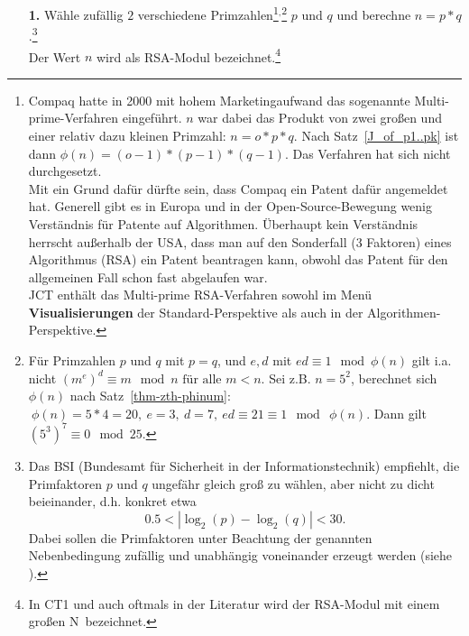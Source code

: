 \begin{refsegment}
\begin{itemize}
\item[\textbf{1.}] Wähle zufällig $2$ verschiedene Primzahlen\footnote{%
Compaq hatte in 2000 mit hohem Marketingaufwand das sogenannte
Multi-prime-Verfahren eingeführt.
$n$ war dabei das Produkt von zwei großen und einer relativ dazu kleinen Primzahl:
$n=o*p*q.$ Nach Satz~\ref{J_of_p1..pk} ist dann $ \phi(n)= (o-1)*(p-1)*(q-1).$ Das
Verfahren hat sich nicht durchgesetzt.\\
Mit ein Grund dafür dürfte sein, dass Compaq ein Patent
dafür angemeldet hat. Generell gibt es in Europa und in der Open-Source-Bewegung
 wenig Verständnis für Patente auf Algorithmen.
Überhaupt kein Verständnis herrscht außerhalb der USA, dass man auf den
Sonderfall (3 Faktoren) eines Algorithmus (RSA) ein Patent beantragen kann,
obwohl das Patent für den allgemeinen Fall schon fast abgelaufen war.\\
   JCT enthält das Multi-prime RSA-Verfahren sowohl im
   Menü \textbf{Visualisierungen} der Standard-Perspektive als auch in der
   Algorithmen-Perspektive.%
}$^,$\footnote{%
Für Primzahlen $p$ und $q$ mit $p=q$, und $e,d$ mit $ed\equiv 1 \mod \phi(n)$
gilt i.a. nicht $ (m^{e})^d \equiv m \mod n \text{ für alle } m <n.$
Sei z.B. $n=5^2$, berechnet sich $\phi(n)$ nach Satz~\ref{thm-zth-phinum}:
$~\phi(n)=5*4=20,~e=3,~d=7,~ed\equiv 21\equiv 1\mod~\phi(n).$ Dann gilt $ (5^3)^7 \equiv 0 \mod 25.$
} $p$ und $q$ und berechne $n = p*q$.\footnote{%
Das BSI  (Bundesamt für Sicherheit in der Informationstechnik) empfiehlt, die Primfaktoren $p$
und $q$ ungefähr gleich groß zu wählen, aber nicht zu dicht beieinander, d.h. konkret etwa
$$ 0.5 < |\log_2 (p) - \log_2 (q) | <30. $$ Dabei sollen die Primfaktoren unter Beachtung der genannten
Nebenbedingung zufällig und unabhängig voneinander erzeugt werden (siehe \cite{BSI2016}).
}\\
Der Wert $n$ wird als RSA-Modul bezeichnet.\footnote{%
In CT1 und auch oftmals in der Literatur wird der RSA-Modul
mit einem großen \glqq N\grqq~bezeichnet.
}


\end{itemize}
\end{refsegment}
